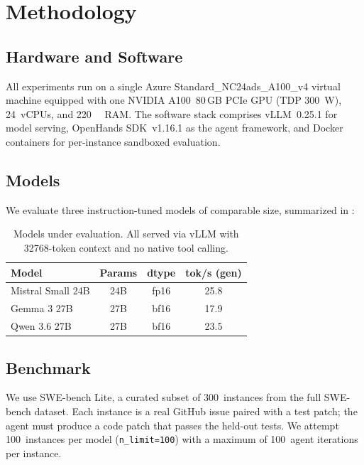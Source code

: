 \documentclass[10pt,twocolumn]{article}
\begin{document}
\section{Methodology}
\label{sec:method}

\subsection{Hardware and Software}
\label{sec:hardware}

All experiments run on a single Azure Standard\_NC24ads\_A100\_v4
virtual machine equipped with one NVIDIA A100~80\,GB PCIe GPU
(TDP \SI{300}{\watt}), 24~vCPUs, and \SI{220}{\giga\byte} RAM.
The software stack comprises vLLM~0.25.1 for model serving,
OpenHands SDK~v1.16.1
as the agent framework, and Docker containers for per-instance
sandboxed evaluation.

\subsection{Models}
\label{sec:models}

We evaluate three instruction-tuned models of comparable size,
summarized in :

\begin{table}[t]
  \centering
  \caption{Models under evaluation. All served via vLLM with
           \num{32768}-token context and no native tool calling.}
  \label{tab:models}
  \small
  \begin{tabular}{@{}lccc@{}}
    \toprule
    \textbf{Model} & \textbf{Params} & \textbf{dtype} &
      \textbf{tok/s (gen)} \\
    \midrule
    Mistral Small 24B & 24B & fp16 & 25.8 \\
    Gemma 3 27B       & 27B & bf16 & 17.9 \\
    Qwen 3.6 27B      & 27B & bf16 & 23.5 \\
    \bottomrule
  \end{tabular}
\end{table}

\subsection{Benchmark}
\label{sec:benchmark}

We use SWE-bench Lite, a curated subset of 300~instances from the
full SWE-bench dataset. Each instance is a real GitHub issue paired
with a test patch; the agent must produce a code patch that passes
the held-out tests. We attempt 100~instances per model
(\texttt{n\_limit=100}) with a maximum of 100~agent iterations per
instance.
\end{document}
